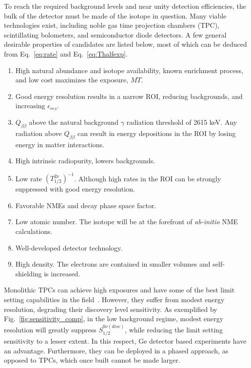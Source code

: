 To reach the required background levels and near unity detection efficiencies, the bulk of the detector must be made of the isotope in question. Many viable technologies exist, including noble gas time projection chambers (TPC), scintillating bolometers, and semiconductor diode detectors. A few general desirable properties of \novbb{} candidates are listed below, most of which can be deduced from Eq.~\ref{eq:rate} and Eq.~\ref{eq:Thalfexp}.
\begin{enumerate}[nolistsep]
	\item High natural abundance and isotope availability,  known enrichment process, and low cost maximizes the exposure, $MT$.
	\item Good energy resolution results in a narrow ROI, reducing backgrounds, and increasing $\epsilon_{res}$. 
	\item $Q_{\beta\beta}$ above the natural background $\gamma$ radiation threshold of 2615 keV. Any radiation above $Q_{\beta\beta}$ can result in energy depositions in the ROI by losing energy in matter interactions.
	\item High intrinsic radiopurity, lowers backgrounds. 
	\item Low \twovbb{} rate $(T^{2\nu}_{1/2})^{-1}$. Although high \twovbb{} rates in the ROI can be strongly suppressed with good energy resolution.
	\item Favorable NMEs and decay phase space factor.
	\item Low atomic number. The  isotope will be at the forefront of \textit{ab-initio} NME calculations.
	\item Well-developed detector technology.
	\item High density. The electrons are contained in smaller volumes and self-shielding is increased.
\end{enumerate} 

Monolithic TPCs can achieve high exposures and have some of the best limit setting capabilities in the field~\cite{exo200}. However, they suffer from modest energy resolution, degrading their discovery level sensitivity. As exemplified by Fig.~\ref{fig:sensitivity_comp}, in the low background regime, modest energy resolution will greatly suppress $S^{0\nu(disc)}_{1/2}$, while reducing the limit setting sensitivity to a lesser extent. In this respect, Ge detector based experiments have an advantage. Furthermore, they can be deployed in a phased approach, as opposed to TPCs, which once built cannot be made larger.

